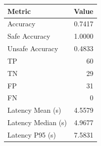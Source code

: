 \begin{table}[ht]
\centering
\begin{tabular}{lr}
\toprule
Metric & Value \\
\midrule
Accuracy & 0.7417 \\
Safe Accuracy & 1.0000 \\
Unsafe Accuracy & 0.4833 \\
TP & 60 \\
TN & 29 \\
FP & 31 \\
FN & 0 \\
Latency Mean (s) & 4.5579 \\
Latency Median (s) & 4.9677 \\
Latency P95 (s) & 7.5831 \\
\bottomrule
\end{tabular}
\end{table}